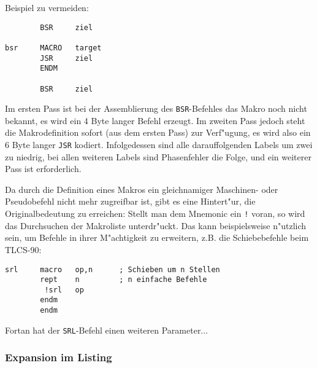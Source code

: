 \documentclass[12pt,a4paper,twoside]{report}
\newcommand{\tty}[1]{{\tt #1}}
\begin{document}
Beispiel zu vermeiden:
\begin{verbatim}
        BSR     ziel

bsr     MACRO   target
        JSR     ziel
        ENDM

        BSR     ziel
\end{verbatim}
Im ersten Pass ist bei der Assemblierung des \tty{BSR}-Befehles das Makro
noch nicht bekannt, es wird ein 4 Byte langer Befehl erzeugt.  Im
zweiten Pass jedoch steht die Makrodefinition sofort (aus dem ersten
Pass) zur Verf"ugung, es wird also ein 6 Byte langer \tty{JSR} kodiert.
Infolgedessen sind alle darauffolgenden Labels um zwei zu niedrig,
bei allen weiteren Labels sind Phasenfehler die Folge, und ein weiterer
Pass ist erforderlich.
\par
Da durch die Definition eines Makros ein gleichnamiger Maschinen- oder
Pseudobefehl nicht mehr zugreifbar ist, gibt es eine Hintert"ur, die
Originalbedeutung zu erreichen: Stellt man dem Mnemonic ein \tty{!} voran,
so wird das Durchsuchen der Makroliste unterdr"uckt.  Das kann
beispielsweise n"utzlich sein, um Befehle in ihrer M"achtigkeit zu
erweitern, z.B. die Schiebebefehle beim TLCS-90:
\begin{verbatim}
srl     macro   op,n      ; Schieben um n Stellen
        rept    n         ; n einfache Befehle
         !srl   op
        endm
        endm
\end{verbatim}
Fortan hat der \tty{SRL}-Befehl einen weiteren Parameter...

\subsubsection{Expansion im Listing}
\end{document}
